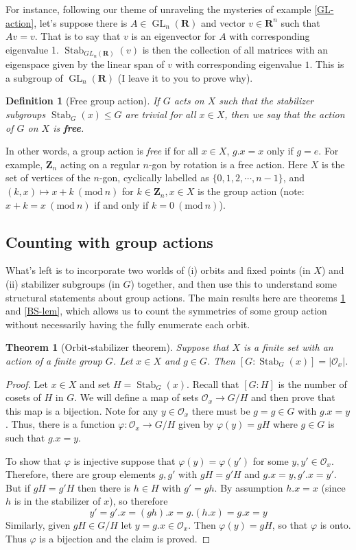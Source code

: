 \documentclass[12pt]{article}
\numberwithin{equation}{subsection}
\newtheorem{thm}[subsection]{Theorem}
\newtheorem{defn}[subsection]{Definition}
\theoremstyle{note}
\newcommand{\Mod}[1]{\ (\mathrm{mod}\ #1)}
\newcommand{\GL}{\operatorname{GL}}
\newcommand{\Stab}{\operatorname{Stab}}
\begin{document}
For instance, following our theme of unraveling the mysteries of example \ref{GL-action}, let's suppose there is $A\in \GL_n(\mathbf{R})$ and  vector $v\in \mathbf{R}^n$ such that $Av=v$. That is to say that $v$ is an eigenvector for $A$ with corresponding eigenvalue 1. $\Stab_{GL_n(\mathbf{R})}(v)$ is then the collection of all matrices with an eigenspace given by the linear span of $v$ with corresponding eigenvalue $1$. This is a subgroup of $\GL_n(\mathbf{R})$ (I leave it to you to prove why). 
\begin{defn}[Free group action]
	If $G$ acts on $X$ such that  the stabilizer subgroups $\Stab_G(x)\leq G$ are trivial for all $x\in X$, then we say that the action of $G$ on $X$ is \textbf{free}.
\end{defn}

In other words, a group action is \textit{free} if for all $x\in X$, $g.x=x$ only if $g=e$. For example, $\mathbf{Z}_n$ acting on a regular $n$-gon by rotation is a free action. Here $X$ is the set of vertices of the $n$-gon, cyclically labelled as $\{0,1,2,\cdots,n-1\}$, and $(k,x)\mapsto x+k\Mod{n}$ for $k\in \mathbf{Z}_n, x\in X$ is the group action (note: $x+k=x\Mod{n}$ if and only if $k=0\Mod{n}$).


\subsection{Counting with group actions}

What's left is to incorporate two worlds of (i) orbits and fixed points (in $X$) and (ii) stabilizer subgroups (in $G$) together, and then use this to understand some structural statements about group actions. The main results here are theorems \ref{orb-stab} and \ref{BS-lem}, which allows us to count the symmetries of some group action without necessarily having the fully enumerate each orbit.
\begin{thm}[Orbit-stabilizer theorem] \label{orb-stab}
	Suppose that $X$ is a finite set with an action of a finite group $G$. Let $x\in X$ and $g\in G$. Then $[ G: \Stab_G(x)]=|\mathcal{O}_x|$.
\end{thm}

\begin{proof}
	Let $x\in X$ and set $H=\Stab_G(x)$. Recall that $[G:H]$ is the number of cosets of $H$ in $G$. We will define a map of sets $\mathcal{O}_x\to G/H$ and then prove that this map is a bijection. Note for any $y\in \mathcal{O}_x$ there must be $g=g\in G$ with $g.x=y$. Thus, there is a function $\varphi\colon \mathcal{O}_x\to G/H$ given by $\varphi(y)= gH$ where $g\in G$ is such that $g.x=y$.
	
	To show that $\varphi$ is injective suppose that $\varphi(y)=\varphi(y')$ for some $y,y'\in \mathcal{O}_x$. Therefore, there are group elements $g,g'$ with $gH=g'H$ and $g.x=y, g'.x=y'$. But if $gH=g'H$ then there is $h\in H$ with $g'=gh$. By assumption $h.x=x$ (since $h$ is in the stabilizer of $x$), so therefore \[y'=g'.x=(gh).x=g.(h.x)=g.x=y\] Similarly, given $gH\in G/H$ let $y=g.x\in \mathcal{O}_x$. Then $\varphi(y)=gH$, so that $\varphi$ is onto. Thus $\varphi$ is a bijection and the claim is proved.
\end{proof}
\end{document}
